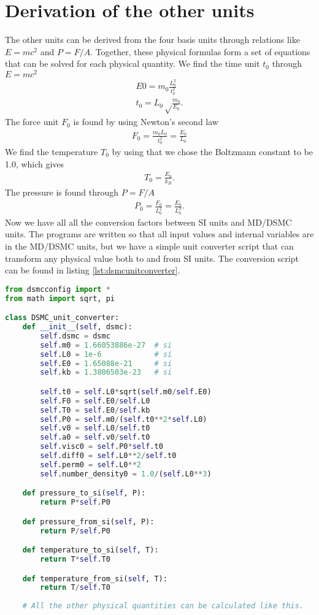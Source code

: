 \section{Derivation of the other units}
The other units can be derived from the four basis units through relations like $E=mc^2$ and $P=F/A$. Together, these physical formulas form a set of equations that can be solved for each physical quantity. We find the time unit $t_0$ through $E=mc^2$
\begin{align}
	E0 = m_0\frac{L_0^2}{t_0^2}\\
	t_0 = L_0\sqrt\frac{m_0}{E_0}.
\end{align}
The force unit $F_0$ is found by using Newton's second law
\begin{align}
	F_0 = \frac{m_0L_0}{t_0^2} = \frac{E_0}{L_0}
\end{align}
We find the temperature $T_0$ by using that we chose the Boltzmann constant to be 1.0, which gives
\begin{align}
	T_0 = \frac{E_0}{k_B}.
\end{align}
The pressure is found through $P=F/A$
\begin{align}
	P_0 = \frac{F_0}{L_0^2} = \frac{E_0}{L_0^3}.
\end{align}
Now we have all all the conversion factors between SI units and MD/DSMC units. The programs are written so that all input values and internal variables are in the MD/DSMC units, but we have a simple unit converter script that can transform any physical value both to and from SI units. The conversion script can be found in listing \ref{lst:dsmcunitconverter}.
\begin{lstlisting}[caption=dsmcUnitConverter.py, label=lst:dsmcunitconverter, language=Python]
from dsmcconfig import *
from math import sqrt, pi

class DSMC_unit_converter:
	def __init__(self, dsmc):
		self.dsmc = dsmc
		self.m0 = 1.66053886e-27  # si
		self.L0 = 1e-6            # si
		self.E0 = 1.65088e-21     # si
		self.kb = 1.3806503e-23   # si

		self.t0 = self.L0*sqrt(self.m0/self.E0)
		self.F0 = self.E0/self.L0
		self.T0 = self.E0/self.kb
		self.P0 = self.m0/(self.t0**2*self.L0)
		self.v0 = self.L0/self.t0
		self.a0 = self.v0/self.t0
		self.visc0 = self.P0*self.t0
		self.diff0 = self.L0**2/self.t0
		self.perm0 = self.L0**2
		self.number_density0 = 1.0/(self.L0**3)

	def pressure_to_si(self, P): 
		return P*self.P0

	def pressure_from_si(self, P): 
		return P/self.P0

	def temperature_to_si(self, T):
		return T*self.T0

	def temperature_from_si(self, T):
		return T/self.T0
	
	# All the other physical quantities can be calculated like this.
\end{lstlisting}